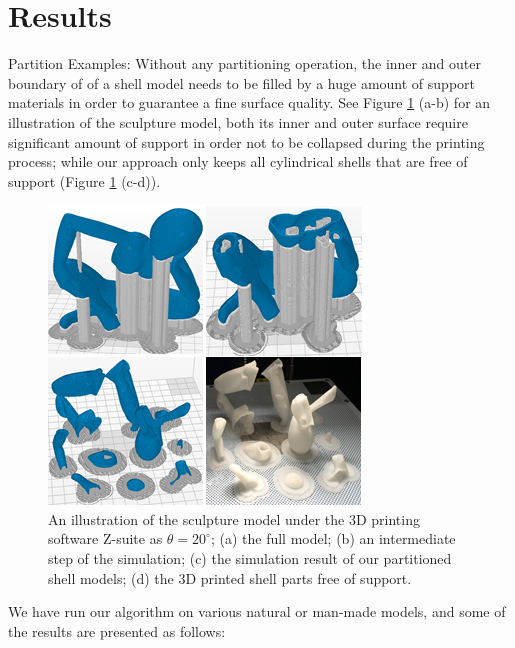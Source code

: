 \section{Results}

Partition Examples: Without any partitioning operation, the inner and outer boundary of of a shell model needs to be filled by a huge amount of support materials in order to guarantee a fine surface quality. See Figure \ref{fig:dear-simulation} (a-b) for an illustration of the sculpture model, both its inner and outer surface require significant amount of support in order not to be collapsed during the printing process; while our approach only keeps all cylindrical shells that are free of support (Figure \ref{fig:dear-simulation} (c-d)).

\begin{figure}[tbp]
  \centering
  \includegraphics[width=\linewidth]{figs/dear-simulation.png}
  \caption{\label{fig:dear-simulation}%
           An illustration of the sculpture model under the 3D printing software Z-suite as $\theta = 20^{\circ}$; (a) the full model; (b) an intermediate step of the simulation; (c) the simulation result of our partitioned shell models; (d) the 3D printed shell parts free of support.}
\end{figure}

We have run our algorithm on various natural or man-made models, and some of the results are presented as follows:

